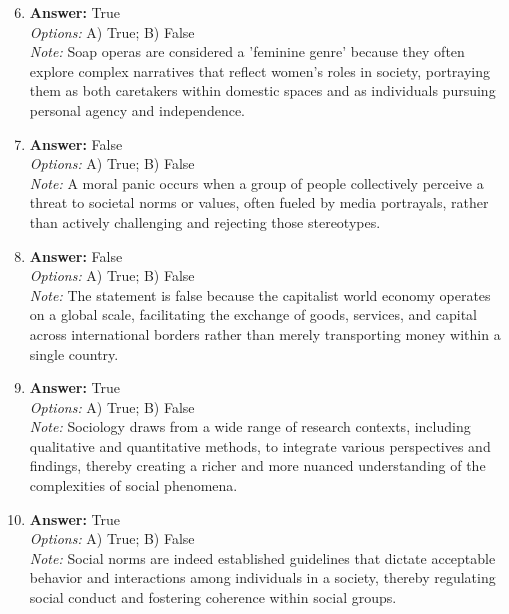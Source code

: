 \documentclass[12pt]{article}
\begin{document}
\begin{enumerate}[label=\arabic*.]
\setcounter{enumi}{5}
\item \textbf{Answer:} True
\\ \textit{Options:} A) True; B) False
\\ \textit{Note:} Soap operas are considered a 'feminine genre' because they often explore complex narratives that reflect women's roles in society, portraying them as both caretakers within domestic spaces and as individuals pursuing personal agency and independence.
\item \textbf{Answer:} False
\\ \textit{Options:} A) True; B) False
\\ \textit{Note:} A moral panic occurs when a group of people collectively perceive a threat to societal norms or values, often fueled by media portrayals, rather than actively challenging and rejecting those stereotypes.
\item \textbf{Answer:} False
\\ \textit{Options:} A) True; B) False
\\ \textit{Note:} The statement is false because the capitalist world economy operates on a global scale, facilitating the exchange of goods, services, and capital across international borders rather than merely transporting money within a single country.
\item \textbf{Answer:} True
\\ \textit{Options:} A) True; B) False
\\ \textit{Note:} Sociology draws from a wide range of research contexts, including qualitative and quantitative methods, to integrate various perspectives and findings, thereby creating a richer and more nuanced understanding of the complexities of social phenomena.
\item \textbf{Answer:} True
\\ \textit{Options:} A) True; B) False
\\ \textit{Note:} Social norms are indeed established guidelines that dictate acceptable behavior and interactions among individuals in a society, thereby regulating social conduct and fostering coherence within social groups.
\end{enumerate}
\end{document}
